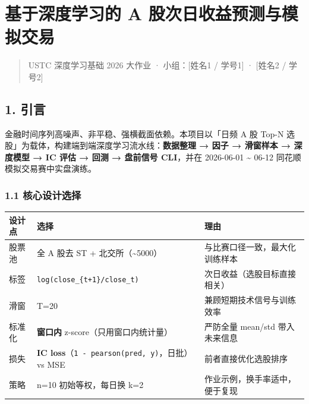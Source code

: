 \documentclass[
  fontset=fandol]{ctexart}
\author{}
\date{}
\begin{document}
\hypertarget{ux57faux4e8eux6df1ux5ea6ux5b66ux4e60ux7684-a-ux80a1ux6b21ux65e5ux6536ux76caux9884ux6d4bux4e0eux6a21ux62dfux4ea4ux6613}{%
\section{基于深度学习的 A
股次日收益预测与模拟交易}\label{ux57faux4e8eux6df1ux5ea6ux5b66ux4e60ux7684-a-ux80a1ux6b21ux65e5ux6536ux76caux9884ux6d4bux4e0eux6a21ux62dfux4ea4ux6613}}

\begin{quote}
USTC 深度学习基础 2026 大作业 ·
小组：{[}姓名1 / 学号1{]} · {[}姓名2 /
学号2{]}
\end{quote}

\hypertarget{ux5f15ux8a00}{%
\subsection{1.
引言}\label{ux5f15ux8a00}}

金融时间序列高噪声、非平稳、强横截面依赖。本项目以「日频
A 股 Top-N
选股」为载体，构建端到端深度学习流水线：\textbf{数据整理
→ 因子 → 滑窗样本 → 深度模型 → IC 评估 →
回测 → 盘前信号 CLI}，并在 2026-06-01
\textasciitilde{} 06-12
同花顺模拟交易赛中实盘演练。

\hypertarget{ux6838ux5fc3ux8bbeux8ba1ux9009ux62e9}{%
\subsubsection{1.1
核心设计选择}\label{ux6838ux5fc3ux8bbeux8ba1ux9009ux62e9}}

\begin{longtable}[]{@{}
  >{\raggedright\arraybackslash}p{}
  >{\raggedright\arraybackslash}p{}
  >{\raggedright\arraybackslash}p{}@{}}
\toprule
设计点 & 选择 & 理由 \\
\midrule
\endhead
股票池 & 全 A 股去 ST +
北交所（\textasciitilde5000） &
与比赛口径一致，最大化训练样本 \\
标签 &
\texttt{log(close\_\{t+1\}/close\_t)} &
次日收益（选股目标直接相关） \\
滑窗 & T=20 &
兼顾短期技术信号与训练效率 \\
标准化 & \textbf{窗口内}
z-score（只用窗口内统计量） & 严防全量
mean/std 带入未来信息 \\
损失 & \textbf{IC
loss}（\texttt{1\ -\ pearson(pred,\ y)}，日批）
vs MSE & 前者直接优化选股排序 \\
策略 & n=10 初始等权，每日换 k=2 &
作业示例，换手率适中，便于复现 \\
\bottomrule
\end{longtable}
\end{document}

